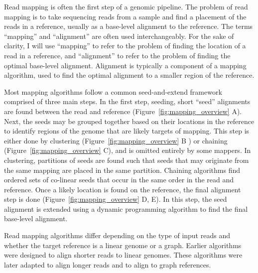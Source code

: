 \documentclass[11pt]{ucscthesis}
\begin{document}
Read mapping is often the first step of a genomic pipeline.
The problem of read mapping is to take sequencing reads from a sample and find a placement of the reads in a reference, usually as a base-level alignment to the reference.
The terms ``mapping'' and ``alignment'' are often used interchangeably.
For the sake of clarity, I will use ``mapping'' to refer to the problem of finding the location of a read in a reference, and ``alignment'' to refer to the problem of finding the optimal base-level alignment.
Alignment is typically a component of a mapping algorithm, used to find the optimal alignment to a smaller region of the reference.

Most mapping algorithms follow a common seed-and-extend framework comprised of three main steps.
In the first step, seeding, short ``seed'' alignments are found between the read and reference (Figure~\ref{fig:mapping_overview} A).
Next, the seeds may be grouped together based on their locations in the reference to identify regions of the genome that are likely targets of mapping.
This step is either done by clustering  (Figure~\ref{fig:mapping_overview} B ) or chaining  (Figure~\ref{fig:mapping_overview} C), and is omitted entirely by some mappers.
In clustering, partitions of seeds are found such that seeds that may originate from the same mapping are placed in the same partition.
Chaining algorithms find ordered sets of co-linear seeds that occur in the same order in the read and reference. 
Once a likely location is found on the reference, the final alignment step is done (Figure~\ref{fig:mapping_overview} D, E).
In this step, the seed alignment is extended using a dynamic programming algorithm to find the final base-level alignment.

Read mapping algorithms differ depending on the type of input reads and whether the target reference is a linear genome or a graph.
Earlier algorithms were designed to align shorter reads to linear genomes.
These algorithms were later adapted to align longer reads and to align to graph references.
\end{document}
